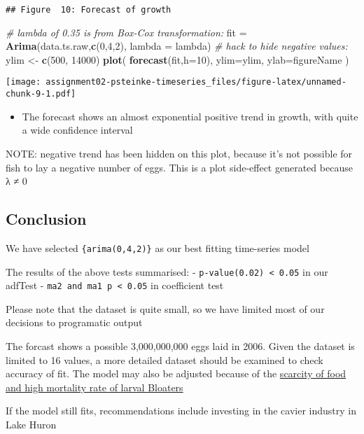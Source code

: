 \documentclass[]{article}
\newenvironment{Shaded}{\begin{snugshade}}{\end{snugshade}}
\newcommand{\CommentTok}[1]{\textcolor[rgb]{0.56,0.35,0.01}{\textit{#1}}}
\newcommand{\DataTypeTok}[1]{\textcolor[rgb]{0.13,0.29,0.53}{#1}}
\newcommand{\DecValTok}[1]{\textcolor[rgb]{0.00,0.00,0.81}{#1}}
\newcommand{\KeywordTok}[1]{\textcolor[rgb]{0.13,0.29,0.53}{\textbf{#1}}}
\newcommand{\NormalTok}[1]{#1}
\newcommand{\StringTok}[1]{\textcolor[rgb]{0.31,0.60,0.02}{#1}}
\providecommand{\tightlist}{%
  \setlength{\itemsep}{0pt}\setlength{\parskip}{0pt}}
\begin{document}
\begin{verbatim}
## Figure  10: Forecast of growth
\end{verbatim}

\begin{Shaded}
\begin{Highlighting}[]
\CommentTok{# lambda of 0.35 is from Box-Cox transformation:}
\NormalTok{fit =}\StringTok{ }\KeywordTok{Arima}\NormalTok{(data.ts.raw,}\KeywordTok{c}\NormalTok{(}\DecValTok{0}\NormalTok{,}\DecValTok{4}\NormalTok{,}\DecValTok{2}\NormalTok{), }\DataTypeTok{lambda =}\NormalTok{ lambda) }
\CommentTok{# hack to hide negative values:}
\NormalTok{ylim <-}\StringTok{ }\KeywordTok{c}\NormalTok{(}\DecValTok{500}\NormalTok{, }\DecValTok{14000}\NormalTok{) }
\KeywordTok{plot}\NormalTok{(}
  \KeywordTok{forecast}\NormalTok{(fit,}\DataTypeTok{h=}\DecValTok{10}\NormalTok{), }
   \DataTypeTok{ylim=}\NormalTok{ylim, }
   \DataTypeTok{ylab=}\NormalTok{figureName}
\NormalTok{   )}
\end{Highlighting}
\end{Shaded}

\texttt{[image: assignment02-psteinke-timeseries\_files/figure-latex/unnamed-chunk-9-1.pdf]}

\begin{itemize}
\tightlist
\item
  The forecast shows an almost exponential positive trend in growth,
  with quite a wide confidence interval
\end{itemize}

NOTE: negative trend has been hidden on this plot, because it's not
possible for fish to lay a negative number of eggs. This is a plot
side-effect generated because λ ≠ 0

\hypertarget{conclusion}{%
\subsection{Conclusion}\label{conclusion}}

We have selected \texttt{\{arima(0,4,2)\}} as our best fitting
time-series model

The results of the above tests summarised: -
\texttt{p-value(0.02)\ \textless{}\ 0.05} in our adfTest -
\texttt{ma2\ and\ ma1\ p\ \textless{}\ 0.05} in coefficient test

Please note that the dataset is quite small, so we have limited most of
our decisions to programatic output

The forcast shows a possible 3,000,000,000 eggs laid in 2006. Given the
dataset is limited to 16 values, a more detailed dataset should be
examined to check accuracy of fit. The model may also be adjusted
because of the
\href{https://en.wikipedia.org/wiki/Coregonus_hoyi}{scarcity of food and
high mortality rate of larval Bloaters}

If the model still fits, recommendations include investing in the cavier
industry in Lake Huron
\end{document}
